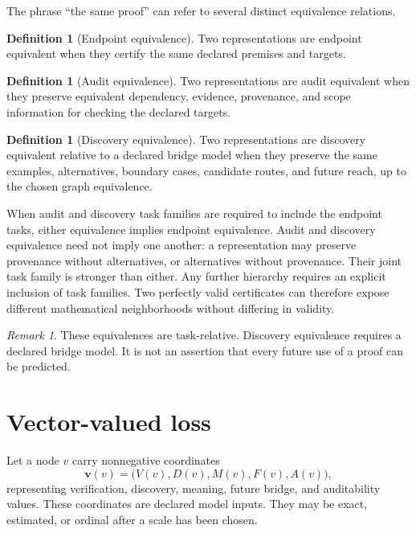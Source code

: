 \documentclass[11pt,oneside]{article}
\theoremstyle{definition}
\newtheorem{definition}[theorem]{Definition}
\theoremstyle{remark}
\newtheorem{remark}[theorem]{Remark}
\begin{document}
The phrase ``the same proof'' can refer to several distinct equivalence relations.

\begin{definition}[Endpoint equivalence]
Two representations are endpoint equivalent when they certify the same declared premises and targets.
\end{definition}

\begin{definition}[Audit equivalence]
Two representations are audit equivalent when they preserve equivalent dependency, evidence, provenance, and scope information for checking the declared targets.
\end{definition}

\begin{definition}[Discovery equivalence]
Two representations are discovery equivalent relative to a declared bridge model when they preserve the same examples, alternatives, boundary cases, candidate routes, and future reach, up to the chosen graph equivalence.
\end{definition}

When audit and discovery task families are required to include the endpoint tasks, either equivalence implies endpoint equivalence. Audit and discovery equivalence need not imply one another: a representation may preserve provenance without alternatives, or alternatives without provenance. Their joint task family is stronger than either. Any further hierarchy requires an explicit inclusion of task families. Two perfectly valid certificates can therefore expose different mathematical neighborhoods without differing in validity.

\begin{remark}
These equivalences are task-relative. Discovery equivalence requires a declared bridge model. It is not an assertion that every future use of a proof can be predicted.
\end{remark}

\section{Vector-valued loss}

Let a node $v$ carry nonnegative coordinates
\[
\mathbf v(v)=
\bigl(V(v),D(v),M(v),F(v),A(v)\bigr),
\]
representing verification, discovery, meaning, future bridge, and auditability values. These coordinates are declared model inputs. They may be exact, estimated, or ordinal after a scale has been chosen.
\end{document}

